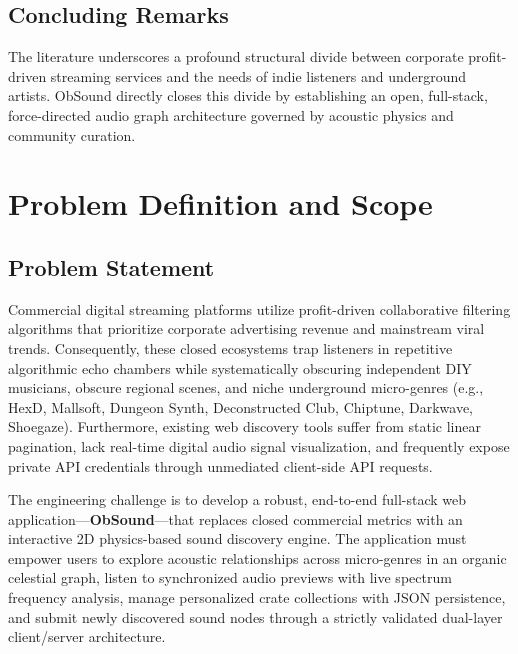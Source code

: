 \documentclass[12pt,a4paper,oneside]{report}
\begin{document}
\section{Concluding Remarks}
The literature underscores a profound structural divide between corporate profit-driven streaming services and the needs of indie listeners and underground artists. ObSound directly closes this divide by establishing an open, full-stack, force-directed audio graph architecture governed by acoustic physics and community curation.

\chapter{Problem Definition and Scope}

\section{Problem Statement}
Commercial digital streaming platforms utilize profit-driven collaborative filtering algorithms that prioritize corporate advertising revenue and mainstream viral trends. Consequently, these closed ecosystems trap listeners in repetitive algorithmic echo chambers while systematically obscuring independent DIY musicians, obscure regional scenes, and niche underground micro-genres (e.g., HexD, Mallsoft, Dungeon Synth, Deconstructed Club, Chiptune, Darkwave, Shoegaze). Furthermore, existing web discovery tools suffer from static linear pagination, lack real-time digital audio signal visualization, and frequently expose private API credentials through unmediated client-side API requests.

The engineering challenge is to develop a robust, end-to-end full-stack web application---\textbf{ObSound}---that replaces closed commercial metrics with an interactive 2D physics-based sound discovery engine. The application must empower users to explore acoustic relationships across micro-genres in an organic celestial graph, listen to synchronized audio previews with live spectrum frequency analysis, manage personalized crate collections with JSON persistence, and submit newly discovered sound nodes through a strictly validated dual-layer client/server architecture.
\end{document}
